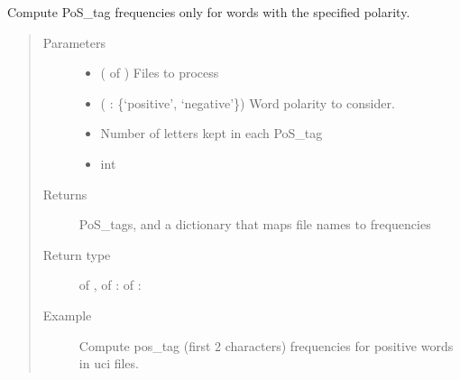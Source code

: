 \documentclass[letterpaper,10pt,english]{sphinxmanual}
\begin{document}

\begin{fulllineitems}
\label{\detokenize{analysis:loacore.analysis.frequencies.polarity_word_pos_tag_frequencies}}
Compute PoS\_tag frequencies only for words with the specified polarity.
\begin{quote}\begin{description}
\item[{Parameters}] \leavevmode\begin{itemize}
\item {} 
 ( of ) \textendash{} Files to process

\item {} 
 ( : \{‘positive’, ‘negative’\}) \textendash{} Word polarity to consider.

\item {} 
 \textendash{} Number of letters kept in each PoS\_tag

\item {} 
 \textendash{} int

\end{itemize}

\item[{Returns}] \leavevmode
PoS\_tags, and a dictionary that maps file names to frequencies

\item[{Return type}] \leavevmode
{} of  ,  of  :  of  : 

\item[{Example}] \leavevmode
Compute pos\_tag (first 2 characters) frequencies for positive words in uci files.

%
\begin{sphinxVerbatim}[commandchars=\\\{\}]
   
   


\end{sphinxVerbatim}
\end{description}
\end{quote}
\end{fulllineitems}
\end{document}
